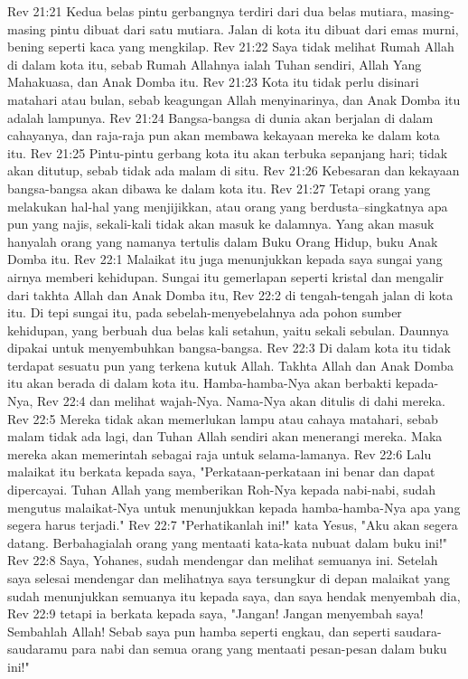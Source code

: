 Rev 21:21  Kedua belas pintu gerbangnya terdiri dari dua belas mutiara, masing-masing pintu dibuat dari satu mutiara. Jalan di kota itu dibuat dari emas murni, bening seperti kaca yang mengkilap.
Rev 21:22  Saya tidak melihat Rumah Allah di dalam kota itu, sebab Rumah Allahnya ialah Tuhan sendiri, Allah Yang Mahakuasa, dan Anak Domba itu.
Rev 21:23  Kota itu tidak perlu disinari matahari atau bulan, sebab keagungan Allah menyinarinya, dan Anak Domba itu adalah lampunya.
Rev 21:24  Bangsa-bangsa di dunia akan berjalan di dalam cahayanya, dan raja-raja pun akan membawa kekayaan mereka ke dalam kota itu.
Rev 21:25  Pintu-pintu gerbang kota itu akan terbuka sepanjang hari; tidak akan ditutup, sebab tidak ada malam di situ.
Rev 21:26  Kebesaran dan kekayaan bangsa-bangsa akan dibawa ke dalam kota itu.
Rev 21:27  Tetapi orang yang melakukan hal-hal yang menjijikkan, atau orang yang berdusta--singkatnya apa pun yang najis, sekali-kali tidak akan masuk ke dalamnya. Yang akan masuk hanyalah orang yang namanya tertulis dalam Buku Orang Hidup, buku Anak Domba itu.
Rev 22:1  Malaikat itu juga menunjukkan kepada saya sungai yang airnya memberi kehidupan. Sungai itu gemerlapan seperti kristal dan mengalir dari takhta Allah dan Anak Domba itu,
Rev 22:2  di tengah-tengah jalan di kota itu. Di tepi sungai itu, pada sebelah-menyebelahnya ada pohon sumber kehidupan, yang berbuah dua belas kali setahun, yaitu sekali sebulan. Daunnya dipakai untuk menyembuhkan bangsa-bangsa.
Rev 22:3  Di dalam kota itu tidak terdapat sesuatu pun yang terkena kutuk Allah. Takhta Allah dan Anak Domba itu akan berada di dalam kota itu. Hamba-hamba-Nya akan berbakti kepada-Nya,
Rev 22:4  dan melihat wajah-Nya. Nama-Nya akan ditulis di dahi mereka.
Rev 22:5  Mereka tidak akan memerlukan lampu atau cahaya matahari, sebab malam tidak ada lagi, dan Tuhan Allah sendiri akan menerangi mereka. Maka mereka akan memerintah sebagai raja untuk selama-lamanya.
Rev 22:6  Lalu malaikat itu berkata kepada saya, "Perkataan-perkataan ini benar dan dapat dipercayai. Tuhan Allah yang memberikan Roh-Nya kepada nabi-nabi, sudah mengutus malaikat-Nya untuk menunjukkan kepada hamba-hamba-Nya apa yang segera harus terjadi."
Rev 22:7  "Perhatikanlah ini!" kata Yesus, "Aku akan segera datang. Berbahagialah orang yang mentaati kata-kata nubuat dalam buku ini!"
Rev 22:8  Saya, Yohanes, sudah mendengar dan melihat semuanya ini. Setelah saya selesai mendengar dan melihatnya saya tersungkur di depan malaikat yang sudah menunjukkan semuanya itu kepada saya, dan saya hendak menyembah dia,
Rev 22:9  tetapi ia berkata kepada saya, "Jangan! Jangan menyembah saya! Sembahlah Allah! Sebab saya pun hamba seperti engkau, dan seperti saudara-saudaramu para nabi dan semua orang yang mentaati pesan-pesan dalam buku ini!"
